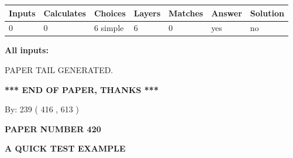 \documentclass[12pt]{article}
\begin{document}
 
\noindent{}
 
 
   
   
   
   
\noindent\begin{tabular}{|l|l|l|l|l|l|l|}
 \hline
Inputs & Calculates & Choices & Layers & Matches & Answer & Solution \\ \hline
 0  & 
 0  & 
 6
  simple  
  & 
 6  & 
 0  & 
  yes & 
  no 
  \\ \hline
 \end{tabular}
   
   
   
   
\noindent{}
   
   
   
   
\noindent\vspace{0.1in}\hspace{-0.08in} {\textbf{\Large{All inputs: }}}
   
   
   
   
   
   
 \vspace{0.2in}
 
   
   
\vspace{2.0in} PAPER TAIL GENERATED.
   
   
   
   
\vspace{1.0in} 
{\textbf{\large{ *** END OF PAPER, THANKS *** }}} 
   
   
\hspace{1.0in} By: 
 239 ( 416 ,  613 )
   
   
   
   
\newpage 
\setcounter{page}{ 
   420001 } 
   
   
   
   
 {\textbf{ \Large{ PAPER NUMBER  420  }}}
   
   
\vspace{0.2in}
   
   
   
   
   
   
   
   
 \vspace{0.2in}
{\LARGE {\textbf{ A QUICK TEST EXAMPLE}}}
   
\end{document}
